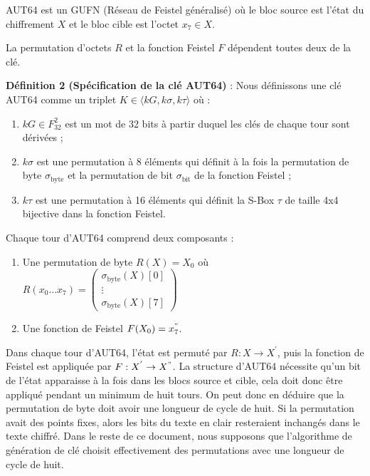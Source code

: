 \documentclass{template}
\begin{document}
AUT64 est un GUFN (Réseau de Feistel généralisé) où le bloc source est l'état du chiffrement $X$ et le bloc cible est l'octet $x_7 \in X$.

La permutation d'octets $R$ et la fonction Feistel $F$ dépendent toutes deux de la clé.

\textbf{Définition 2 (Spécification de la clé AUT64)} : Nous définissons une clé AUT64 comme un triplet $K \in \langle kG, k\sigma, k\tau \rangle$ où :

\begin{enumerate}
  \item $kG \in F_{32}^2$ est un mot de 32 bits à partir duquel les clés de chaque tour sont dérivées ;
  \item $k\sigma$ est une permutation à 8 éléments qui définit à la fois la permutation de byte $\sigma_{\text{byte}}$ et la permutation de bit $\sigma_{\text{bit}}$ de la fonction Feistel ;
  \item $k\tau$ est une permutation à 16 éléments qui définit la S-Box $\tau$ de taille 4x4 bijective dans la fonction Feistel.
\end{enumerate}
Chaque tour d'AUT64 comprend deux composants :
\begin{enumerate}
    \item Une permutation de byte $R(X) = X_0$ où $R(x_0 \ldots x_7) = \begin{pmatrix} \sigma_{\text{byte}}(X)[0] \\ \vdots \\ \sigma_{\text{byte}}(X)[7] \end{pmatrix}$
    \item Une fonction de Feistel $F(X_0) = x_{7}^{"}$.
\end{enumerate}

Dans chaque tour d'AUT64, l'état est permuté par $R : X \rightarrow X^{'}$, puis la fonction de Feistel est appliquée par $F : X^{'} \rightarrow X^{"}$. La structure d'AUT64 nécessite qu'un bit de l'état apparaisse à la fois dans les blocs source et cible, cela doit donc être appliqué pendant un minimum de huit tours. On peut donc en déduire que la permutation de byte doit avoir une longueur de cycle de huit. Si la permutation avait des points fixes, alors les bits du texte en clair resteraient inchangés dans le texte chiffré. Dans le reste de ce document, nous supposons que l'algorithme de génération de clé choisit effectivement des permutations avec une longueur de cycle de huit.
\end{document}
